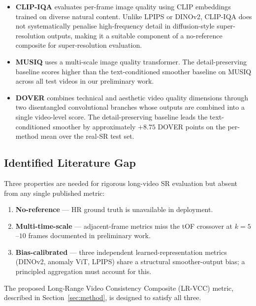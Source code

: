 \begin{itemize}
    \item \textbf{CLIP-IQA} \cite{wang_clipiqa_2023} evaluates per-frame image quality using
          CLIP embeddings trained on diverse natural content. Unlike LPIPS or DINOv2,
          CLIP-IQA does not systematically penalise high-frequency detail in
          diffusion-style super-resolution outputs, making it a suitable component of a
          no-reference composite for super-resolution evaluation.
    \item \textbf{MUSIQ} \cite{ke_musiq_2021} uses a multi-scale image quality transformer.
          The detail-preserving baseline scores higher than the text-conditioned smoother
          baseline on MUSIQ across all test videos in our preliminary work.
    \item \textbf{DOVER} \cite{wu_dover_2023} combines technical and aesthetic video quality
          dimensions through two disentangled convolutional branches whose outputs are
          combined into a single video-level score. The detail-preserving baseline leads
          the text-conditioned smoother by approximately $+8.75$ DOVER points on the
          per-method mean over the real-SR test set.
\end{itemize}

\subsection{Identified Literature Gap}

Three properties are needed for rigorous long-video SR evaluation but absent from any
single published metric:

\begin{enumerate}
    \item \textbf{No-reference} --- HR ground truth is unavailable in deployment.
    \item \textbf{Multi-time-scale} --- adjacent-frame metrics miss the tOF crossover at
          $k{=}5$--$10$ frames documented in preliminary work.
    \item \textbf{Bias-calibrated} --- three independent learned-representation metrics
          (DINOv2, anomaly ViT, LPIPS) share a structural smoother-output bias; a
          principled aggregation must account for this.
\end{enumerate}

The proposed Long-Range Video Consistency Composite (LR-VCC) metric, described in
Section~\ref{sec:method}, is designed to satisfy all three.
